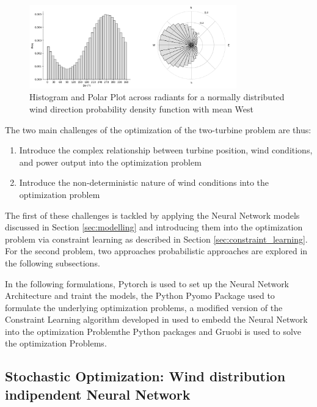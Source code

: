 \documentclass[preprint,12pt]{elsarticle}
\begin{document}
\begin{figure}[h] 
	\centering
	\includegraphics[width=0.8\textwidth]{../figures/optimization/wind_dist.png} %
	\caption{Histogram and Polar Plot across radiants for a normally distributed wind direction probability density function with mean West}
	\label{fig:wind_dist}
\end{figure}

The two main challenges of the optimization of the two-turbine problem are thus: 

\begin{enumerate}
	\item Introduce the complex relationship between turbine position, wind conditions, and power output into the optimization problem
	\item Introduce the non-deterministic nature of wind conditions into the optimization problem
\end{enumerate}

The first of these challenges is tackled by applying the Neural Network models discussed in Section \ref{sec:modelling} and introducing them into the optimization problem via constraint learning as described in Section \ref{sec:constraint_learning}. For the second problem, two approaches probabilistic approaches are explored in the following subsections.

In the following formulations, Pytorch \cite{paszke2017automatic} is used to set up the Neural Network Architecture and traint the models, the Python Pyomo Package \cite{bynum2021pyomo} used to formulate the underlying optimization problems,  a modified version of the Constraint Learning algorithm developed in \cite{alcantara2024distcl} used to embedd the Neural Network into the optimization Problemthe Python packages and Gruobi \cite{gurobi} is used to solve the  optimization Problems.

\subsection{Stochastic Optimization: Wind distribution indipendent Neural Network} \label{sec:stoch_opti_1}
\end{document}
